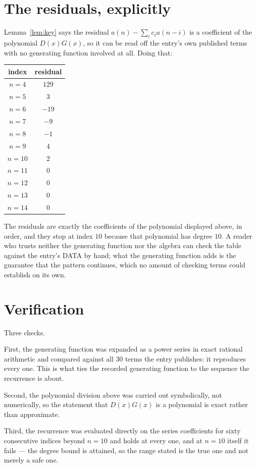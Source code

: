 \documentclass[11pt,a4paper]{article}
\theoremstyle{plain}
\theoremstyle{definition}
\begin{document}
\section{The residuals, explicitly}

Lemma~\ref{lem:key} says the residual $a(n)-\sum_ic_ia(n-i)$ is a coefficient of the
polynomial $D(x)G(x)$, so it can be read off the entry's own published terms with no
generating function involved at all. Doing that:
\begin{center}
\begin{tabular}{cc}
index & residual \\ \hline
$n=4$ & $129$ \\
$n=5$ & $3$ \\
$n=6$ & $-19$ \\
$n=7$ & $-9$ \\
$n=8$ & $-1$ \\
$n=9$ & $4$ \\
$n=10$ & $2$ \\
$n=11$ & $0$ \\
$n=12$ & $0$ \\
$n=13$ & $0$ \\
$n=14$ & $0$
\end{tabular}
\end{center}
The residuals are exactly the coefficients of the polynomial displayed above, in order, and
they stop at index $10$ because that polynomial has degree $10$. A reader who trusts
neither the generating function nor the algebra can check the table against the entry's DATA
by hand; what the generating function adds is the guarantee that the pattern continues, which
no amount of checking terms could establish on its own.

\section{Verification}

Three checks.

First, the generating function was expanded as a power series in exact rational arithmetic and
compared against all $30$ terms the entry publishes: it reproduces every one. This is
what ties the recorded generating function to the sequence the recurrence is about.

Second, the polynomial division above was carried out symbolically, not numerically, so the
statement that $D(x)G(x)$ is a polynomial is exact rather than approximate.

Third, the recurrence was evaluated directly on the series coefficients for sixty consecutive
indices beyond $n=10$ and holds at every one, and at $n=10$ itself it fails --- the
degree bound is attained, so the range stated is the true one and not merely a safe one.
\end{document}
